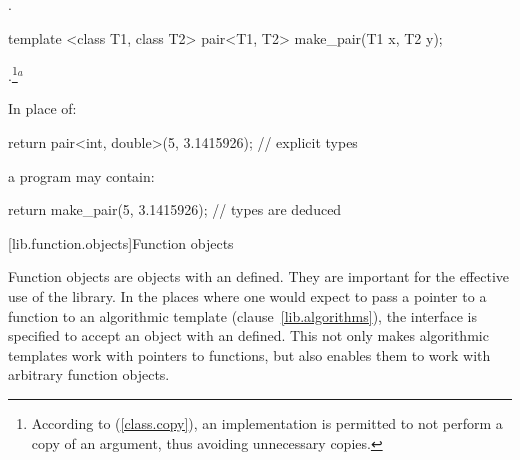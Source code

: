 \begin{itemdescr}
\pnum
\returns
{}.
\end{itemdescr}

%
\begin{itemdecl}
template <class T1, class T2>
  pair<T1, T2> make_pair(T1 x, T2 y);
\end{itemdecl}

\begin{itemdescr}
\pnum
\returns {}.\footnote[214]
{According to (\ref{class.copy}),
an implementation is permitted to not perform a copy of an argument, thus
avoiding unnecessary copies.}$^a$

\pnum
\enterexample
In place of:

\begin{codeblock}
  return pair<int, double>(5, 3.1415926);   // explicit types
\end{codeblock}

a \Cpp program may contain:

\begin{codeblock}
  return make_pair(5, 3.1415926);           // types are deduced
\end{codeblock}
\exitexampleb
\end{itemdescr}

[lib.function.objects]{Function objects}

\pnum
Function objects are objects with an  defined. They are
important for the effective use of the library. In the places where one would
expect to pass a pointer to a function to an algorithmic template
(clause~\ref{lib.algorithms}), the interface is specified to accept an object
with an  defined. This not only makes
algorithmic templates work with pointers to functions, but also enables them to
work with arbitrary function objects.


